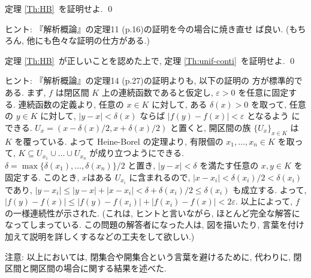 \documentclass[12pt,twoside]{jarticle}
\begin{document}
\begin{question}\qstar{*}
  定理 \ref{Th:HB}\ を証明せよ. \qed
\end{question}

\noindent ヒント: 『解析概論』の定理11 (p.16)の証明を今の場合に焼き直せ
ば良い.  (もちろん, 他にも色々な証明の仕方がある.)

\begin{question}\qstar{*}
  定理 \ref{Th:HB}\ が正しいことを認めた上で, 
  定理 \ref{Th:unif-conti}\ を証明せよ. 
  \qed
\end{question}

\noindent ヒント: 『解析概論』の定理14 (p.27)の証明よりも, 以下の証明の
方が標準的である. まず, $f$ は閉区間 $K$ 上の連続函数であると仮定し, %
$\varepsilon > 0$ を任意に固定する. 連続函数の定義より, %
任意の $x\in K$ に対して, ある $\delta(x) > 0$ を取って, %
任意の $y\in K$ に対して, %
$|y - x| < \delta(x)$ ならば $|f(y) - f(x)| < \varepsilon$ となるよう
にできる. %
$U_x = (x - \delta(x)/2, x + \delta(x)/2)$ と置くと, %
開区間の族 $\{U_x\}_{x\in K}$ は $K$ を覆っている. %
よって Heine-Borel の定理より, %
有限個の $x_1,\dots,x_n \in K$ を取って, %
$K \subseteq U_{x_1}\cup\dots\cup U_{x_n}$ が成り立つようにできる. %
$\delta = \max\{\delta(x_1),\dots,\delta(x_n)\}/2$ と置き, %
$|y - x| < \delta$ を満たす任意の $x,y\in K$ を固定する. %
このとき, $x$はある $U_{x_i}$ に含まれるので, %
$|x - x_i| < \delta(x_i)/2 < \delta(x_i)$ であり, %
$|y - x_i| \le |y-x|+|x-x_i| < \delta+\delta(x_i)/2 \le \delta(x_i)$ %
も成立する. %
よって, $|f(y)-f(x)| \le |f(y)-f(x_i)|+|f(x_i)-f(x)| < 2\varepsilon$. 
以上によって, $f$ の一様連続性が示された. (これは, ヒントと言いながら,
ほとんど完全な解答になってしまっている. この問題の解答者になった人は, 
図を描いたり, 言葉を付け加えて説明を詳しくするなどの工夫をして欲しい.)

\medskip
\noindent 注意: 以上においては, 閉集合や開集合という言葉を避けるために,
代わりに, 閉区間と開区間の場合に関する結果を述べた. 
\end{document}
